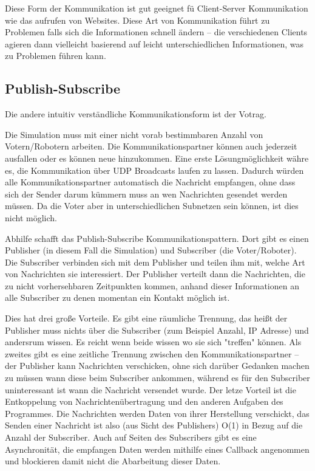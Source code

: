 Diese Form der Kommunikation ist gut geeignet f{\"{u}} Client-Server Kommunikation wie das
aufrufen von Websites. Diese Art von Kommunikation f{\"{u}}hrt zu Problemen falls sich die
Informationen schnell {\"{a}}ndern -- die verschiedenen Clients agieren dann vielleicht basierend
auf leicht unterschiedlichen Informationen, was zu Problemen f{\"{u}}hren kann.

\subsection{Publish-Subscribe}
Die andere intuitiv verst{\"{a}}ndliche Kommunikationsform ist der Votrag.

Die Simulation muss mit einer nicht vorab bestimmbaren Anzahl von Votern/Robotern arbeiten. Die Kommunikationspartner k{\"{o}}nnen auch jederzeit ausfallen oder es k{\"{o}}nnen neue hinzukommen.
Eine erste L{\"{o}}sungm{\"{o}}glichkeit w{\"{a}}hre es, die Kommunikation {\"{u}}ber UDP Broadcasts
laufen zu lassen. Dadurch w{\"{u}}rden alle Kommunikationspartner automatisch die Nachricht empfangen, ohne
dass sich der Sender darum k{\"{u}}mmern muss an wen Nachrichten gesendet werden m{\"{u}}ssen. Da die
Voter aber in unterschiedlichen Subnetzen sein k{\"{o}}nnen, ist dies nicht m{\"{o}}glich.

Abhilfe schafft das Publish-Subscribe Kommunikationspattern\cite{pubsub}. Dort gibt es einen Publisher (in
diesem Fall die Simulation) und Subscriber (die Voter/Roboter). Die Subscriber verbinden sich mit dem
Publisher und teilen ihm mit, welche Art von Nachrichten sie interessiert. Der Publisher verteilt dann die
Nachrichten, die zu nicht vorhersehbaren Zeitpunkten kommen, anhand dieser Informationen an alle Subscriber zu denen momentan ein Kontakt m{\"{o}}glich ist.

Dies hat drei gro{\ss}e Vorteile. Es gibt eine r{\"{a}}umliche Trennung, das hei{\ss}t der Publisher muss
nichts {\"{u}}ber die Subscriber (zum Beispiel Anzahl, IP Adresse) und andersrum wissen. Es reicht
wenn beide wissen wo sie sich "treffen" k{\"{o}}nnen. Als zweites gibt es eine zeitliche Trennung zwischen
den Kommunikationspartner -- der Publisher kann Nachrichten verschicken, ohne sich dar{\"{u}}ber Gedanken
machen zu m{\"{u}}ssen wann diese beim Subscriber ankommen, w{\"{a}}hrend es f{\"{u}}r den Subscriber
uninteressant ist wann die Nachricht versendet wurde. Der letze Vorteil ist die Entkoppelung von
Nachrichten{\"{u}}bertragung und den anderen Aufgaben des Programmes. Die Nachrichten werden Daten
von ihrer Herstellung verschickt, das Senden einer Nachricht ist also (aus Sicht des
Publishers) O(1) in Bezug auf die Anzahl der Subscriber. Auch auf Seiten des Subscribers gibt es eine
Asynchronit{\"{a}}t, die empfangen Daten werden mithilfe eines Callback angenommen und blockieren damit
nicht die Abarbeitung dieser Daten.

